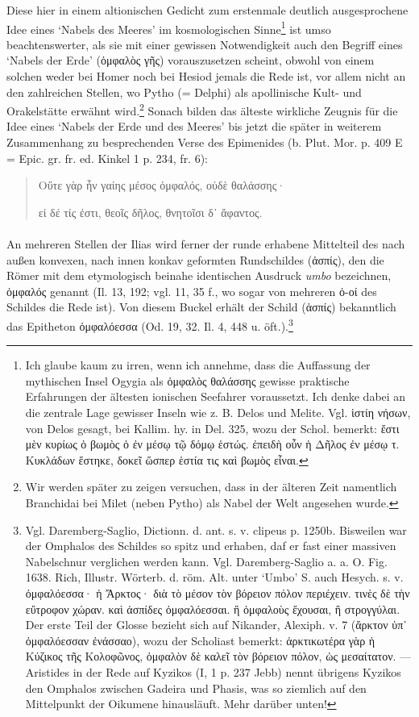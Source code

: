 \documentclass[a4paper, 11pt, oneside]{article}
\begin{document}
Diese hier in einem altionischen Gedicht zum erstenmale deutlich ausgesprochene Idee eines `Nabels des Meeres' im kosmologischen Sinne\footnote{Ich glaube kaum zu irren, wenn ich annehme, dass die Auffassung der mythischen Insel Ogygia als ὀμφαλὸς θαλάσσης gewisse praktische Erfahrungen der ältesten ionischen Seefahrer voraussetzt. Ich denke dabei an die zentrale Lage gewisser Inseln wie z. B. Delos und Melite. Vgl. ἱστίη νήσων, von Delos gesagt, bei Kallim. hy. in Del. 325, wozu der Schol. bemerkt: ἔστι μὲν κυρίως ὁ βωμὸς ὁ ἐν μέσῳ τῷ δόμῳ ἑστώς. ἐπειδὴ οὖν ἡ Δῆλος ἐν μέσῳ τ. Κυκλάδων ἕστηκε, δοκεῖ ὥσπερ ἑστία τις καὶ βωμὸς εἶναι.} ist umso beachtenswerter, als sie mit einer gewissen Notwendigkeit auch den Begriff eines `Nabels der Erde' (ὀμφαλὸς γῆς) vorauszusetzen scheint, obwohl von einem solchen weder bei Homer noch bei Hesiod jemals die Rede ist, vor allem nicht an den zahlreichen Stellen, wo Pytho (= Delphi) als apollinische Kult- und Orakelstätte erwähnt wird.\footnote{Wir werden später zu zeigen versuchen, dass in der älteren Zeit namentlich Branchidai bei Milet (neben Pytho) als Nabel der Welt angesehen wurde.} Sonach bilden das älteste wirkliche Zeugnis für die Idee eines `Nabels der Erde und des Meeres' bis jetzt die später in weiterem Zusammenhang zu besprechenden Verse des Epimenides (b. Plut. Mor. p. 409 E = Epic. gr. fr. ed. Kinkel 1 p. 234, fr. 6):
\begin{quotation}
Οὔτε γὰρ ἦν γαίης μέσος ὀμφαλός, οὐδὲ θαλάσσης·

εἰ δέ τίς ἐστι, θεοῖς δῆλος, θνητοῖσι δ᾽ ἄφαντος.
\end{quotation}
\paragraph{}
An mehreren Stellen der Ilias wird ferner der runde erhabene Mittelteil des nach außen konvexen, nach innen konkav geformten Rundschildes (ἀσπίς), den die Römer mit dem etymologisch beinahe identischen Ausdruck \emph{umbo} bezeichnen, ὀμφαλός genannt (Il. 13, 192; vgl. 11, 35 f., wo sogar von mehreren ὀ-οί des Schildes die Rede ist). Von diesem Buckel erhält der Schild (ἀσπίς) bekanntlich das Epitheton ὀμφαλόεσσα (Od. 19, 32. Il. 4, 448 u. öft.).\footnote{Vgl. Daremberg-Saglio, Dictionn. d. ant. s. v. clipeus p. 1250b. Bisweilen war der Omphalos des Schildes so spitz und erhaben, daf er fast einer massiven Nabelschnur verglichen werden kann. Vgl. Daremberg-Saglio a. a. O. Fig. 1638. Rich, Illustr. Wörterb. d. röm. Alt. unter `Umbo' S. auch Hesych. s. v. ὀμφαλόεσσα· ἡ Ἄρκτος· διὰ τὸ μέσον τὸν βόρειον πόλον περιέχειν. τινὲς δὲ τὴν εὔτροφον χώραν. καὶ ἀσπίδες ὀμφαλόεσσαι. ἢ ὀμφαλοὺς ἔχουσαι, ἢ στρογγύλαι. Der erste Teil der Glosse bezieht sich auf Nikander, Alexiph. v. 7 (ἄρκτον ὑπ᾽ ὀμφαλόεσσαν ἐνάσσαο), wozu der Scholiast bemerkt: ἀρκτικωτέρα γὰρ ἡ Κύζικος τῆς Κολοφῶνος, ὀμφαλὸν δὲ καλεῖ τὸν βόρειον πόλον, ὡς μεσαίτατον. --- Aristides in der Rede auf Kyzikos (I, 1 p. 237 Jebb) nennt übrigens Kyzikos den Omphalos zwischen Gadeira und Phasis, was so ziemlich auf den Mittelpunkt der Oikumene hinausläuft. Mehr darüber unten!}
\end{document}
